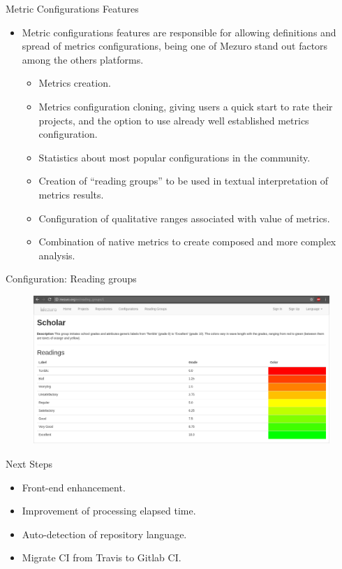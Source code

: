 \begin{block}{Metric Configurations Features}
    \begin{itemize}
        \item Metric configurations features are responsible for allowing
            definitions and spread of metrics configurations, being
            one of Mezuro stand out factors among the others platforms.
            \begin{itemize}
                \item Metrics creation.
                \item Metrics configuration cloning, giving users a quick start
                    to rate their projects, and the option to use already well
                    established metrics configuration.
                \item Statistics about most popular configurations in the
                    community.
                \item Creation of ``reading groups'' to be used in textual
                    interpretation of metrics results.
                \item Configuration of qualitative ranges associated with
                    value of metrics.
                \item Combination of native metrics to create composed and more
                    complex analysis.
            \end{itemize}
    \end{itemize}
\end{block}

\begin{block}{Configuration: Reading groups}
    \begin{figure}
        \begin{center}
            \includegraphics[width=\textwidth]{figures/ReadingGroup.png}
            \label{fig:feature1}
        \end{center}
    \end{figure}
\end{block}

\begin{block}{Next Steps}
    \begin{itemize}
        \item Front-end enhancement.
        \item Improvement of processing elapsed time.
        \item Auto-detection of repository language.
        \item Migrate CI from Travis to Gitlab CI.
    \end{itemize}
\end{block}
